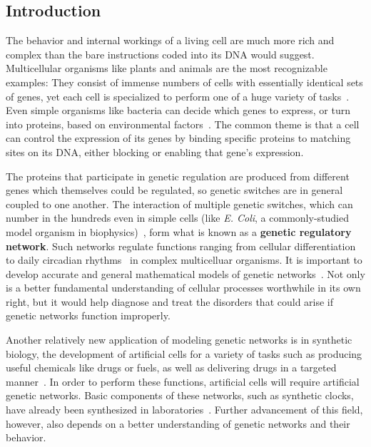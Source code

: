 \documentclass[english,letterpaper,12pt]{report}
\newcommand{\defkeywd}[1]{\textbf{#1}}
\begin{document}
\begin{doublespacing}

\chapter{Introduction} %
\label{sec:introduction}


The behavior and internal workings of a living cell are much more rich and complex than the bare instructions coded into its DNA would suggest. Multicellular organisms like plants and animals are the most recognizable examples: They consist of immense numbers of cells with essentially identical sets of genes, yet each cell is specialized to perform one of a huge variety of tasks~\cite{grn-review}. Even simple organisms like bacteria can decide which genes to express, or turn into proteins, based on environmental factors~\cite{ecoli-decision}.  The common theme is that a cell can control the expression of its genes by binding specific proteins to matching sites on its DNA, either blocking or enabling that gene's expression.

The proteins that participate in genetic regulation are produced from different genes which themselves could be regulated, so genetic switches are in general coupled to one another. The interaction of multiple genetic switches, which can number in the hundreds even in simple cells (like \textit{E. Coli}, a commonly-studied model organism in biophysics)~\cite{ecoli-operons}, form what is known as a \defkeywd{genetic regulatory network}. Such networks regulate functions ranging from cellular differentiation~\cite{grn-review} to daily circadian rhythms~\cite{circ-rhythm-review} in complex multicelluar organisms. It is important to develop accurate and general mathematical models of genetic networks~\cite{review-in-numero}. Not only is a better fundamental understanding of cellular processes worthwhile in its own right, but it would help diagnose and treat the disorders that could arise if genetic networks function improperly.

Another relatively new application of modeling genetic networks is in synthetic biology, the development of artificial cells for a variety of tasks such as producing useful chemicals like drugs or fuels, as well as delivering drugs in a targeted manner~\cite{synth-bio-applications}. In order to perform these functions, artificial cells will require artificial genetic networks. Basic components of these networks, such as synthetic clocks, have already been synthesized in laboratories~\cite{synth-osc}. Further advancement of this field, however, also depends on a better understanding of genetic networks and their behavior.


\end{doublespacing}
\end{document}
